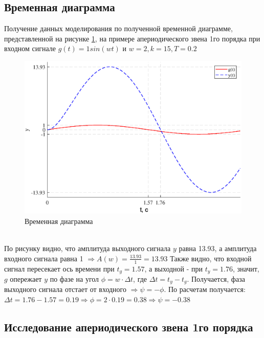 \documentclass[a4paper,12pt]{article}
\renewcommand{\figurename}{Рисунок}
\begin{document}
	
	\newpage
	\begin{center}
		\section{Временная диаграмма}
	\end{center}
	\par
	Получение данных моделирования по полученной временной диаграмме, представленной на рисунке \ref{prim}, на примере апериодического звена 1го порядка при входном сигнале $g(t)=1sin(wt)$ и $w=2,k=15, T=0.2$
	\begin{figure}[h!]
		\renewcommand{\figurename}{Рисунок}
		\centering
		\includegraphics[width=6in]{prim1.eps}
		\caption{Временная диаграмма}
		\label{prim}
	\end{figure}\\

	По рисунку видно, что амплитуда выходного сигнала $y$ равна 13.93, а амплитуда входного сигнала равна 1 $\Rightarrow A(w)=\frac{13.93}{1}=13.93$ Также видно, что входной сигнал пересекает ось времени при $t_g=1.57$, а выходной - при $t_y=1.76$, значит, $g$ опережает $y$ по фазе на угол $\phi=w\cdot \Delta t$, где $\Delta t=t_y-t_g$. Получается, фаза выходного сигнала отстает от входного $\Rightarrow \psi=-\phi$. По расчетам получается: $\Delta t = 1.76-1.57=0.19 \Rightarrow \phi=2\cdot0.19=0.38 \Rightarrow \psi=-0.38$     
	
	




	\newpage
	\begin{center}
	\section{Исследование апериодического звена 1го порядка}
	\end{center}
\end{document}
